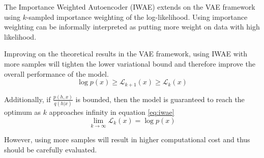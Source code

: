 

The Importance Weighted Autoencoder\cite{iwae:2015} (IWAE) extends on the VAE framework using $k$-sampled importance weighting of the log-likelihood.
Using importance weighting can be informally interpreted as putting more weight on data with high likelihood.

Improving on the theoretical results in the VAE framework, using IWAE with more samples will tighten the lower variational bound and therefore improve the overall performance of the model.
\begin{equation*}
\log p(x) \geq \mathcal{L}_{k+1}(x) \geq \mathcal{L}_{k}(x)
\end{equation*}

Additionally, if $\frac{p(h,x)}{q(h|x)}$ is bounded, then the model is guaranteed to reach the optimum as $k$ approaches infinity in equation \ref{eq:iwae}
\begin{equation}
\label{eq:iwae}
\lim_{k \rightarrow \infty} \mathcal{L}_{k}(x) = \log p(x)
\end{equation}

However, using more samples will result in higher computational cost and thus should be carefully evaluated.

